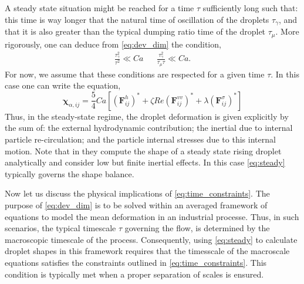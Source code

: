 A steady state situation might be reached for a time $\tau$ sufficiently long such that: this time is way longer that the natural time of oscillation of the droplets $\tau_\gamma$, and that it is also greater than the typical dumping ratio time of the droplet $\tau_\mu$. 
More rigorously, one can deduce from \ref{eq:dev_dim} the condition,
\begin{align}
    \frac{\tau_\gamma^2}{\tau^2}\ll Ca
    && \frac{\tau_\gamma^2}{\tau_\mu \tau}\ll Ca. 
    \label{eq:time_constraints}
\end{align}
For now, we assume that these conditions are respected for a given time $\tau$.
In this case one can write the equation, 
\begin{equation}
    \bm\chi_{\alpha,ij}
    =\frac{5  }{4}  Ca [(\textbf{F}_{ij}^h)^*
    + \zeta Re (\textbf{F}_{ij}^{vv})^*
    + \lambda (\textbf{F}_{ij}^{\sigma})^*]
    \label{eq:steady}
\end{equation}
Thus, in the steady-state regime, the droplet deformation is given explicitly by the sum of: the external hydrodynamic contribution; the inertial due to internal particle re-circulation; and the particle internal stresses due to this internal motion. 
Note that in \citet{taylor1964deformation} they compute the shape of a steady state rising droplet analytically and consider low but finite inertial effects. 
In this case \ref{eq:steady} typically governs the shape balance.
 
Now let us discuss the physical implications of \ref{eq:time_constraints}. 
The purpose of \ref{eq:dev_dim} is to be solved within an averaged framework of equations to model the mean deformation in an industrial processe. 
Thus, in such scenarios, the typical timescale $\tau$ governing the flow, is determined by the macroscopic timescale of the process. 
Consequently, using \ref{eq:steady} to calculate droplet shapes in this framework requires that the timesscale of the macroscale equations satisfies the constraints outlined in \ref{eq:time_constraints}.
This condition is typically met when a proper separation of scales is ensured. 

